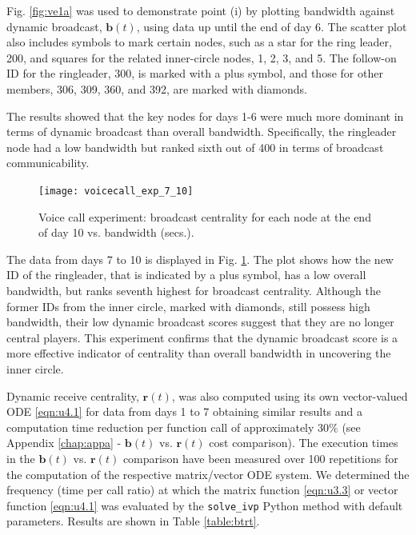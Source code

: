 Fig. \ref{fig:ve1a} was used to demonstrate point (i) by plotting bandwidth against dynamic broadcast, $\mathbf{b}(t)$, using data up until the end of day 6. The scatter plot also includes symbols to mark certain nodes, such as a star for the ring leader, 200, and squares for the related inner-circle nodes, 1, 2, 3, and 5. The follow-on ID for the ringleader, 300, is marked with a plus symbol, and those for other members, 306, 309, 360, and 392, are marked with diamonds.

The results showed that the key nodes for days 1-6 were much more dominant in terms of dynamic broadcast than overall bandwidth. Specifically, the ringleader node had a low bandwidth but ranked sixth out of 400 in terms of broadcast communicability.

\begin{figure}[h]\centering
    \texttt{[image: voicecall\_exp\_7\_10]}
    \caption{Voice call experiment: broadcast centrality for each node at the end of day 10 vs. bandwidth (secs.).}
    \label{fig:ve1b}
    \bigskip
\end{figure}

The data from days 7 to 10 is displayed in Fig. \ref{fig:ve1b}. The plot shows how the new ID of the ringleader, that is indicated by a plus symbol, has a low overall bandwidth, but ranks seventh highest for broadcast centrality. Although the former IDs from the inner circle, marked with diamonds, still possess high bandwidth, their low dynamic broadcast scores suggest that they are no longer central players. This experiment confirms that the dynamic broadcast score is a more effective indicator of centrality than overall bandwidth in uncovering the inner circle.

Dynamic receive centrality, $\mathbf{r}(t)$, was also computed using its own vector-valued ODE \eqref{eqn:u4.1} for data from days 1 to 7 obtaining similar results and a computation time reduction per function call of approximately $30\%$ (see Appendix \ref{chap:appa} - $\mathbf{b}(t)$ vs. $\mathbf{r}(t)$ cost comparison). The execution times in the $\mathbf{b}(t)$ vs. $\mathbf{r}(t)$ comparison have been measured over 100 repetitions for the computation of the respective matrix/vector ODE system. We determined the frequency (time per call ratio) at which the matrix function \eqref{eqn:u3.3} or vector function \eqref{eqn:u4.1} was evaluated by the \texttt{solve\_ivp} Python method with default parameters. Results are shown in Table \ref{table:btrt}.

